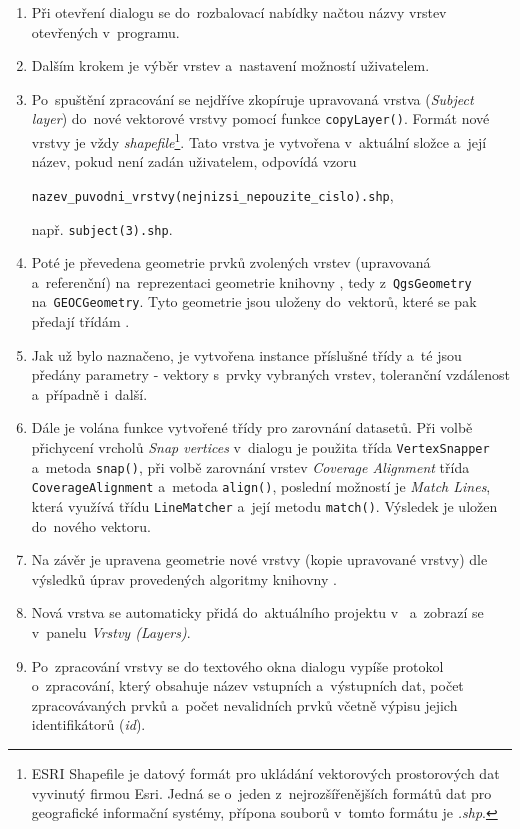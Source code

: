 \begin{enumerate}
 \item Při otevření dialogu se do~rozbalovací nabídky načtou názvy vrstev 
	otevřených v~programu.
 \item Dalším krokem je výběr vrstev a~nastavení možností uživatelem.
 \item Po~spuštění zpracování se nejdříve zkopíruje upravovaná vrstva 
	(\textit{Subject layer}) do~nové vektorové vrstvy pomocí funkce 
	\texttt{copyLayer()}. Formát nové vrstvy je vždy 
	\textit{shapefile}\footnote{ESRI Shapefile je datový formát pro ukládání 
	vektorových prostorových dat  vyvinutý firmou Esri. Jedná se o~jeden 
	  z~nejrozšířenějších formátů dat pro geografické informační systémy,
	  přípona souborů v~tomto formátu je \textit{.shp}.}.
	Tato vrstva je vytvořena v~aktuální složce a~její název, pokud není
	zadán uživatelem, odpovídá vzoru
	\begin{center}
	 \texttt{nazev\_puvodni\_vrstvy(nejnizsi\_nepouzite\_cislo).shp},
	\end{center}
	např. \texttt{subject(3).shp}.
 \item Poté je převedena geometrie prvků zvolených vrstev (upravovaná
	a~referenční) na~repre\-zentaci geometrie knihovny ,
	tedy z~\texttt{Qgs\-Geo\-metry} na~\texttt{GEOC\-Geo\-metry}. 
	Tyto geometrie 	jsou uloženy do~vektorů, které se pak předají 
	třídám .
 \item Jak už bylo naznačeno, je vytvořena instance příslušné třídy 
	 a~té jsou předány parametry - vektory s~prvky vybraných
	vrstev, toleranční vzdálenost a~případně i~další. 
 \item Dále je volána funkce vytvořené třídy pro zarovnání datasetů. Při volbě 
	při\-chycení vrcholů \textit{Snap vertices} v~dialogu je použita třída 
	\texttt{Vertex\-Snapper} a~metoda \texttt{snap()}, při volbě zarovnání 
	vrstev \textit{Coverage Alignment} třída \texttt{Cove\-rage\-Align\-ment} 
	a~metoda \texttt{align()}, poslední možností je \textit{Match Lines}, která
	využívá třídu \texttt{Line\-Matcher} a~její metodu \texttt{match()}. 
	Výsledek je uložen do~nového vektoru.
 \item Na závěr je upravena geometrie nové vrstvy (kopie upravované vrstvy) dle
	vý\-sledků úprav provedených algoritmy knihovny .
 \item Nová vrstva se automaticky přidá do~aktuálního projektu v~ 
	a~zobrazí se v~panelu \textit{Vrstvy (Layers)}.
 \item Po~zpracování vrstvy se do textového okna dialogu vypíše protokol 
	o~zpracování, kte\-rý obsahuje název vstupních a~výstupních dat, počet
	zpracovávaných prvků a~počet neva\-lidních prvků včetně výpisu jejich
	identifikátorů (\textit{id}).
\end{enumerate}





 

